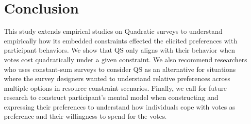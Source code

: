 \section{Conclusion}
This study extends empirical studies on Quadratic surveys to understand empirically how its embedded constraints effected the elicited preferences with participant behaviors. We show that QS only aligns with their behavior when votes cost quadratically under a given constraint. We also recommend researchers who uses constant-sum surveys to consider QS as an alternative for situations where the survey designers wanted to understand relative preferences across multiple options in resource constraint scenarios. Finally, we call for future research to construct participant's mental model when constructing and expressing their preferences to understand how individuals cope with votes as preference and their willingness to spend for the votes.